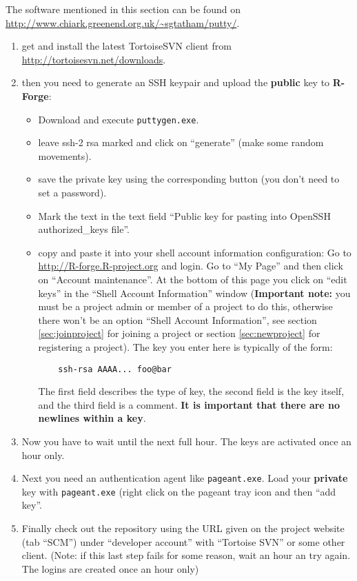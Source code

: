 \documentclass[a4paper]{article}
\begin{document}
The software mentioned in this section can be found
on\newline
\url{http://www.chiark.greenend.org.uk/~sgtatham/putty/}.
\begin{enumerate}
\item get and install the latest TortoiseSVN client from
  \url{http://tortoisesvn.net/downloads}.
\item then you need to generate an SSH keypair and upload the \textbf{public}
  key to \textbf{R-Forge}:
  \begin{itemize}
  \item Download and execute \texttt{puttygen.exe}.
  \item leave ssh-2 rsa marked and click on ``generate'' (make some
    random movements).
  \item save the private key using the corresponding button (you don't
    need to set a password).
  \item  Mark the text in the text field ``Public key
    for pasting into OpenSSH authorized\_keys file''.
  \item copy and paste it into your shell account information
    configuration: Go to \url{http://R-forge.R-project.org} and
    login. Go to ``My Page'' and then click on ``Account
    maintenance''. At the bottom 
    of this page you click on ``edit keys'' in the ``Shell Account
    Information'' window (\textbf{Important note:} you must be a project admin
    or member of a project to do this, otherwise there won't be an
    option ``Shell Account Information'', see section
    \ref{sec:joinproject} for joining a project or section
    \ref{sec:newproject} for registering a project).
    The key you enter here is typically of the form:
    \begin{verbatim}
    ssh-rsa AAAA... foo@bar
    \end{verbatim}
    The first field
    describes the type of key, the second field is the key itself, and
    the third field is a comment. \textbf{It is important that there are no
      newlines within a key}.
  \end{itemize}
\item Now you have to wait until the next full hour. The keys are
  activated once an hour only.
\item Next you need an authentication agent like \texttt{pageant.exe}. Load
  your \textbf{private} key with \texttt{pageant.exe} (right click on
  the pageant tray icon and then ``add key''.
\item Finally check out the repository using the URL given on the
  project website (tab ``SCM'') under ``developer account'' with
  ``Tortoise SVN'' or some other client. (Note: if this last step
  fails for some reason, wait an hour an try again. The logins are
  created once an hour only)
\end{enumerate}
\end{document}
